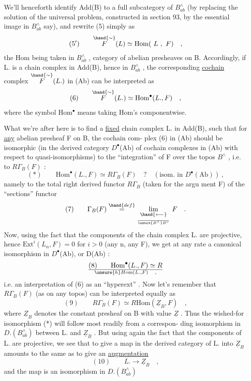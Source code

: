 
We'll henceforth identify Add(B) to a full subcategory of $B^{\wedge}_{ab}$
(by replacing the solution of the universal problem, constructed in
section 93, by the essential  image in $B^{\wedge}_{ab}$ say), and rewrite (5)
simply as
\[ (5') \qquad \overset{\hand{\sim}}{F}(L)\simeq \mathrm{Hom}(\ L\ ,\ F) \quad , \]
the Hom being taken in $B^{\wedge}_{ab}$ , category of abelian presheaves on B.
Accordingly, if L. is a chain complex in Add(B), hence in $B^{\wedge}_{ab}$ ,
the corresponding \uline{cochain} complex $\overset{\hand{\sim}}{F}(L.)$ in (Ab) can be interpreted as
\[ (6) \qquad \overset{\hand{\sim}}{F}(L.)\simeq \mathrm{Hom}^{\bullet}(L.,F) \quad , \]
where  the symbol Hom$^{\bullet}$ means taking Hom's componentwise.

 What we're after here is to find a \uline{fixed} chain complex L. in
Add(B), such that for \uline{any} abelian presheaf F on B, the cochain com-%
plex (6) in (Ab) should be isomorphic (in the derived category 
$D^{\bullet}$(Ab) of cochain complexes in (Ab) with respect to quasi-isomorphisms)
to the ``integration'' of F over the topos $B^{\wedge}$ , i.e. to $R\Gamma_B(F)$ :
\[ (*) \qquad \mathrm{Hom}^{\bullet}(L.,F)\simeq R\Gamma_B(F) \quad ? \quad (\text{isom. in } D^{\bullet}(\mathrm{Ab}))\ , \]
namely to the total right derived functor $R\Gamma_B$ (taken  for the argu
ment F) of the ``sections'' functor
\[ (7) \qquad \Gamma_B(F) \overset{\hand{def}}{=} \underset{\over{\unsure{B^{\wedge}}}{B^{\circ}}}{\underset{\hand{\longleftarrow}}{\mathrm{lim}}}\ F \quad . \]
Now, using the fact that the components of the chain complex L. are
projective, hence $\mathrm{Ext}^{i}(L_n,F) = 0$ for $i > 0$ (any n, any F), we get
at any rate a canonical isomorphism in $D^{\bullet}$(Ab), or  D(Ab) :
\[ (8) \qquad \mathrm{Hom}^{\bullet}(L.,F) \simeq R\over{\unsure{h}}{H}\mathrm{om}(L.,F) \quad , \]
i.e. an interpretation of (6) as an ``hyperext'' . Now let's remember
that $R\Gamma_B(F)$ (as on any topos) can be interpreted equally as
\[ (9) \qquad R\Gamma_B(F)\simeq R\mathrm{Hom}(\underline{Z}_B,F) \quad , \]
where $\underline{Z}_B$ denotes the constant presheaf on B with value $\underline{Z}$ . Thus\inserted{,} the
wished-for isomorphism (*) will follow most readily from a correspon-%
ding isomorphism in $D.(B^{\wedge}_{ab})$ between L. and $\underline{Z}_B$ . But using again
the fact that the components of L. are projective, we see that to give
a map in the derived category of L. into $\underline{Z}_B$ amounts to the same as to
give an \uline{augmentation}
\[ (10) \qquad L. \longrightarrow \underline{Z}_B \quad , \]
and the map is an isomorphism in $D.(B^{\wedge}_{ab})$

